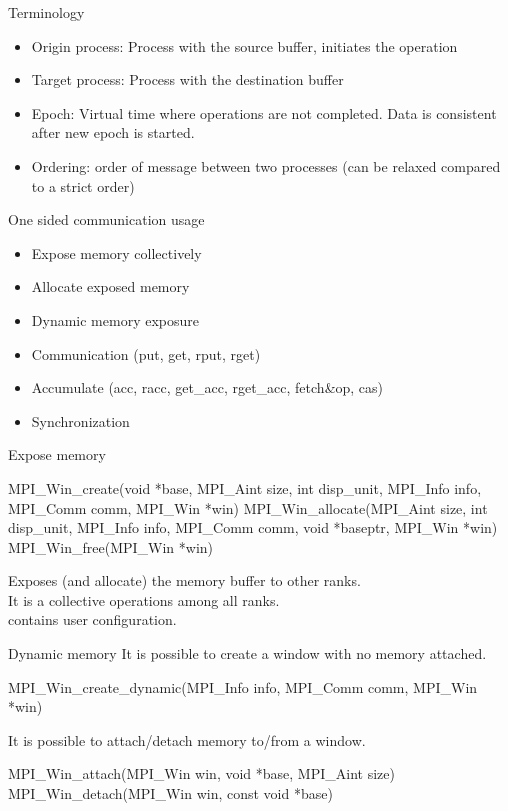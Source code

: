 \documentclass[aspectratio=43]{beamer}
\begin{document}
\begin{frame}[fragile]{Terminology}
\begin{itemize}
\item Origin process: Process with the source buffer, initiates the operation
\item Target process: Process with the destination buffer
\item Epoch: Virtual time where operations are not completed. Data is consistent after new epoch is started.
\item Ordering: order of message between two processes (can be relaxed compared to a strict order)
\end{itemize}

\end{frame}

\begin{frame}[fragile]{One sided communication usage}
\begin{itemize}
\item Expose memory collectively
\item Allocate exposed memory
\item Dynamic memory exposure
\item Communication (put, get, rput, rget)
\item Accumulate (acc, racc, get\_acc, rget\_acc, fetch\&op, cas)
\item Synchronization
\end{itemize}
\end{frame}

\begin{frame}[fragile]{Expose memory}

\begin{Cpplisting}[]{}
MPI_Win_create(void *base, MPI_Aint size, int disp_unit, MPI_Info info, MPI_Comm comm, MPI_Win *win)
MPI_Win_allocate(MPI_Aint size, int disp_unit, MPI_Info info, MPI_Comm comm, void *baseptr, MPI_Win *win)
MPI_Win_free(MPI_Win *win)
\end{Cpplisting}
Exposes (and allocate) the memory buffer to other ranks.\\
It is a collective operations among all ranks.\\

 contains user configuration.\\
\end{frame}

\begin{frame}[fragile]{Dynamic memory}
It is possible to create a window with no memory attached.

\begin{Cpplisting}[]{}
MPI_Win_create_dynamic(MPI_Info info, MPI_Comm comm, MPI_Win *win)
\end{Cpplisting}

It is possible to attach/detach memory to/from a window.
\begin{Cpplisting}[]{}
MPI_Win_attach(MPI_Win win, void *base, MPI_Aint size)
MPI_Win_detach(MPI_Win win, const void *base)
\end{Cpplisting}
\end{frame}
\end{document}
